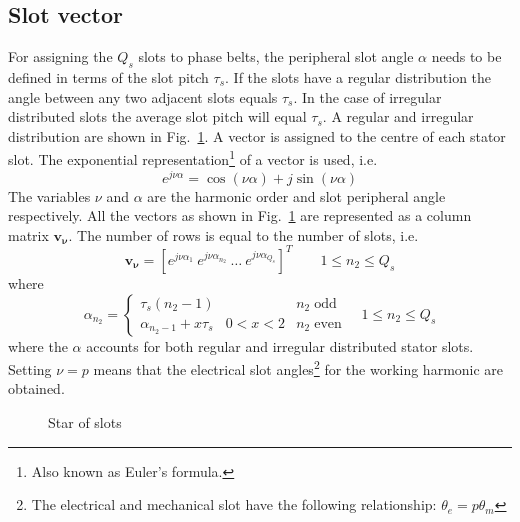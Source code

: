 \subsection{Slot vector}
For assigning the $Q_s$ slots to phase belts, the peripheral slot angle $\alpha$ needs to be defined in terms of the slot pitch $\tau_s$. If the slots have a regular distribution the angle between any two adjacent slots equals $\tau_s$. In the case of irregular distributed slots the average slot pitch will equal $\tau_s$. A regular and irregular distribution are shown in Fig.~\ref{fig:f_slotstar}. A vector is assigned to the centre of each stator slot. The exponential representation\footnote{Also known as Euler's formula.} of a vector is used, i.e.
\begin{equation} 
  e^{j\nu \alpha}=\cos(\nu \alpha)+j\sin(\nu \alpha)
\end{equation}
The variables $\nu$ and $\alpha$ are the harmonic order and slot peripheral angle respectively. All the vectors as shown in Fig.~\ref{fig:f_slotstar} are represented as a column matrix $\mathbf{v_{\nu}}$. The number of rows is equal to the number of slots, i.e.
\begin{equation}
  \label{eqn:slot_vector}
  \mathbf{v_{\nu}}=\left[
                         e^{j\nu\alpha_1} 
                         \: 
                         e^{j\nu\alpha_{n_2}} 
                         \:
                         \ldots 
                         \: e^{j\nu\alpha_{Q_s}}
                    \right]^{T}
   \qquad 1 \leq n_2 \leq Q_s                 
\end{equation}
where
\begin{equation}
  \label{eqn:slot_alpha}
  \alpha_{n_2} = \left\{ \begin{array}{lll}
	  \tau_s\left(n_2-1\right) && n_2 \;\text{odd}\\
	  \alpha_{n_2-1}+x\tau_s & 0<x<2 & n_2\;\text{even}
	\end{array} \right.
	\quad
	1 \leq n_2 \leq Q_s
\end{equation}
where the $\alpha$ accounts for both regular and irregular distributed stator slots. Setting $\nu=p$ means that the electrical slot angles\footnote{The electrical and mechanical slot have the following relationship: $\theta_e=p \theta_m$} for the working harmonic are obtained. 
\begin{figure}
	\centering
		
	\caption{Star of slots}
	\label{fig:f_slotstar}
\end{figure}

